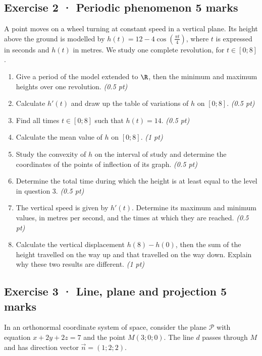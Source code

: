\subsection*{Exercise 2 · Periodic phenomenon \hfill 5 marks}A point moves on a wheel turning at constant speed in a vertical plane. Its height above the ground is modelled by $h(t)=12-4\cos\left(\frac{\pi t}{4}\right)$, where $t$ is expressed in seconds and $h(t)$ in metres. We study one complete revolution, for $t\in[0;8]$.

\begin{enumerate}

\item Give a period of the model extended to $\R$, then the minimum and maximum heights over one revolution. \hfill\textit{(0.5 pt)}

\item Calculate $h'(t)$ and draw up the table of variations of $h$ on $[0;8]$. \hfill\textit{(0.5 pt)}

\item Find all times $t\in[0;8]$ such that $h(t)=14$. \hfill\textit{(0.5 pt)}

\item Calculate the mean value of $h$ on $[0;8]$. \hfill\textit{(1 pt)}

\item Study the convexity of $h$ on the interval of study and determine the coordinates of the points of inflection of its graph. \hfill\textit{(0.5 pt)}

\item Determine the total time during which the height is at least equal to the level in question 3. \hfill\textit{(0.5 pt)}

\item The vertical speed is given by $h'(t)$. Determine its maximum and minimum values, in metres per second, and the times at which they are reached. \hfill\textit{(0.5 pt)}

\item Calculate the vertical displacement $h(8)-h(0)$, then the sum of the height travelled on the way up and that travelled on the way down. Explain why these two results are different. \hfill\textit{(1 pt)}

\end{enumerate}

\clearpage{}\par

\subsection*{Exercise 3 · Line, plane and projection \hfill 5 marks}In an orthonormal coordinate system of space, consider the plane $\mathcal P$ with equation $x+2y+2z=7$ and the point $M(3;0;0)$. The line $d$ passes through $M$ and has direction vector $\vec n=(1;2;2)$.

